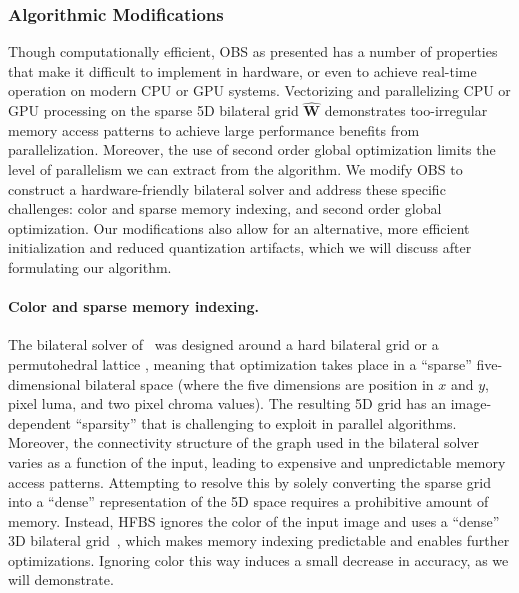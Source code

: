 \subsubsection{Algorithmic Modifications}\label{sec:alg_mod}
Though computationally efficient, OBS as presented has a number of properties that make it difficult to implement in hardware, or even to achieve real-time operation on modern CPU or GPU systems.
Vectorizing and parallelizing CPU or GPU processing on the sparse 5D bilateral grid $\mathbf{\hat W}$ demonstrates too-irregular memory access patterns to achieve large performance benefits from parallelization.
Moreover, the use of second order global optimization limits the level of parallelism we can extract from the algorithm.
We modify OBS to construct a hardware-friendly bilateral solver and address these specific challenges: color and sparse memory indexing, and second order global optimization.
Our modifications also allow for an alternative, more efficient initialization and reduced quantization artifacts, which we will discuss after formulating our algorithm.

\paragraph{Color and sparse memory indexing.}
The bilateral solver of~\cite{BarronPoole2016} was designed around a hard bilateral grid or a permutohedral lattice \cite{Adams2010}, meaning that optimization takes place in a ``sparse'' five-dimensional bilateral space (where the five dimensions are position in $x$ and $y$, pixel luma, and two pixel chroma values).
The resulting 5D grid has an image-dependent ``sparsity'' that is challenging to exploit in parallel algorithms.
Moreover, the connectivity structure of the graph used in the bilateral solver varies as a function of the input, leading to expensive and unpredictable memory access patterns.
Attempting to resolve this by solely converting the sparse grid into a ``dense'' representation of the 5D space requires a prohibitive amount of memory.
Instead, HFBS ignores the color of the input image and uses a ``dense'' 3D bilateral grid~\cite{Chen2007}, which makes memory indexing predictable and enables further optimizations. Ignoring color this way induces a small decrease in accuracy, as we will demonstrate.

